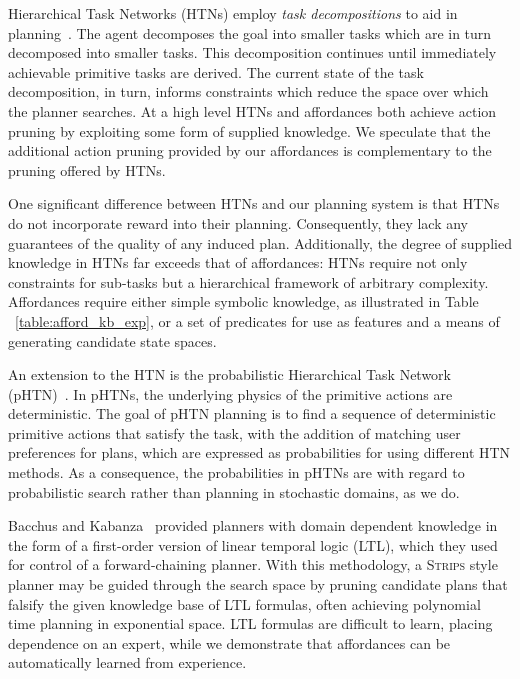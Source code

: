 \documentclass[letterpaper]{article}
\begin{document}

Hierarchical Task Networks (HTNs) employ \textit{task decompositions}
to aid in planning~\cite{erol1994htn}. The agent decomposes the goal
into smaller tasks which are in turn decomposed into smaller
tasks. This decomposition continues until immediately achievable
primitive tasks are derived. The current state of the task
decomposition, in turn, informs constraints which reduce the space
over which the planner searches. At a high level HTNs and affordances
both achieve action pruning by exploiting some form of supplied
knowledge. We speculate that the additional action pruning provided by our affordances
is complementary to the pruning offered by HTNs.

One significant difference between HTNs and our planning system is that HTNs do not incorporate reward into their planning. Consequently, they lack any guarantees of the quality of any
induced plan. Additionally, the degree of supplied knowledge in HTNs
far exceeds that of affordances: HTNs require not only constraints for
sub-tasks but a hierarchical framework of arbitrary
complexity. Affordances require either simple symbolic knowledge, as
illustrated in Table ~\ref{table:afford_kb_exp}, or a set of
predicates for use as features and a means of generating candidate
state spaces.


An extension to the HTN is the probabilistic Hierarchical Task Network (pHTN)~\cite{li2010learning}. In pHTNs, the underlying physics of the primitive actions are deterministic. The goal of pHTN planning is to find a sequence of deterministic primitive actions that satisfy the task, with the addition of matching user preferences for plans, which are expressed as probabilities for using different HTN methods. As a consequence, the probabilities in pHTNs are with regard to probabilistic search rather than planning in stochastic domains, as we do.


Bacchus and
Kabanza~\cite{Bacchus95usingtemporal,Bacchus99usingtemporal} provided
planners with domain dependent knowledge in the form of a first-order
version of linear temporal logic (LTL), which they used for control of
a forward-chaining planner. With this methodology, a \textsc{Strips}
style planner may be guided through the search space by pruning
candidate plans that falsify the given knowledge base of LTL formulas,
often achieving polynomial time planning in exponential space.  LTL
formulas are difficult to learn, placing dependence on an expert,
while we demonstrate that affordances can be automatically learned
from experience.
\end{document}
